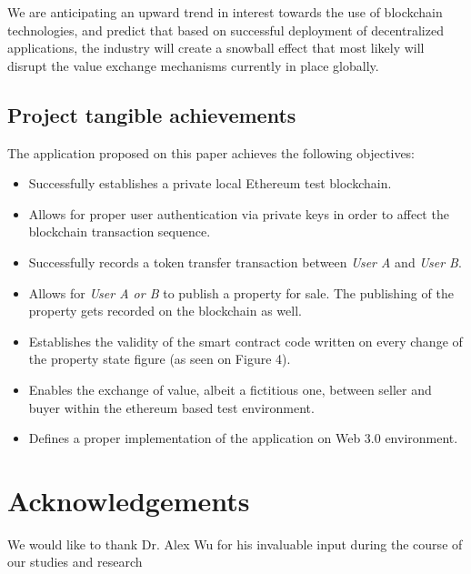 \documentclass[submission,copyright,creativecommons]{eptcs}
\begin{document}
We are anticipating an upward trend in interest towards the use of blockchain technologies, and predict that based on successful deployment of decentralized applications, the industry will create a snowball effect that most likely will disrupt the value exchange mechanisms currently in place globally. 

\subsection{Project tangible achievements}
The application proposed on this paper achieves the following objectives:
\begin{itemize}
    \item Successfully establishes a private local Ethereum test blockchain.
    \item Allows for proper user authentication via private keys in order to affect the blockchain transaction sequence.
    \item Successfully records a token transfer transaction between \textit{User A} and \textit{User B}.
    \item Allows for \textit{User A or B} to publish a property for sale.  The publishing of the property gets recorded on the blockchain as well.
    \item Establishes the validity of the smart contract code written on every change of the property state figure (as seen on Figure 4).
    \item Enables the exchange of value, albeit a fictitious one, between seller and buyer within the ethereum based test environment.
    \item Defines a proper implementation of the application on Web 3.0 environment.
\end{itemize}

\section{Acknowledgements}
We would like to thank Dr. Alex Wu for his invaluable input during the course of our studies and research

\newpage

\begin{multicols}{2}

\end{multicols}
\end{document}
